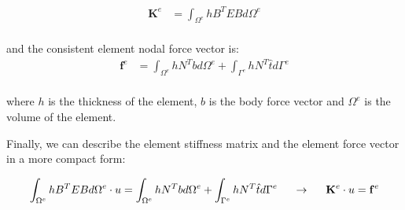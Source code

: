\documentclass{article}  %
\begin{document}
\begin{align}
  \mathbf{K}^e &= \int_{\Omega^e} h B^T E B d\Omega^e \\
\end{align}

and the consistent element nodal force vector is:
\begin{align}
  \mathbf{f}^e &= \int_{\Omega^e} h N^T b d\Omega^e +  \int_{\Gamma^e} h N^T \hat{t} d\Gamma^e\\
\end{align}

where $h$ is the thickness of the element, $b$ is the body force vector and $\Omega^e$ is the volume of the element.

Finally, we can describe the element stiffness matrix and the element force vector in a more compact form:

\begin{align}
  \int_{\Omega^e} h B^T E B d\Omega^e \cdot u = \int_{\Omega^e} h N^T b d\Omega^e +  \int_{\Gamma^e} h N^T \hat{t} d\Gamma^e \hspace{0.5cm} \rightarrow \hspace{0.5cm} \mathbf{K}^e \cdot u = \mathbf{f}^e
\end{align}

\subsection{}
\end{document}
